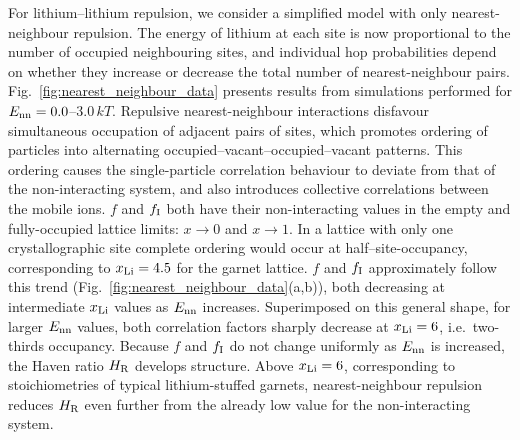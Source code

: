 \documentclass[aps,prb,twocolumn,superscriptaddress,reprint]{revtex4-1}
\newcommand{\xLi}{x_\m{Li}}
\begin{document}
For lithium--lithium repulsion, we consider a simplified model with only nearest-neighbour repulsion. 
The energy of lithium at each site is now proportional to the number of occupied neighbouring sites, and individual hop probabilities depend on whether they increase or decrease the total number of nearest-neighbour pairs. 
Fig.~\ref{fig:nearest_neighbour_data} presents results from simulations performed for $E_{\mathrm{nn}}=0.0$--$3.0\,kT$. 
Repulsive nearest-neighbour interactions disfavour simultaneous occupation of adjacent pairs of sites, which promotes ordering of particles into alternating  occupied--vacant--occupied--vacant patterns.
This ordering causes the single-particle correlation behaviour to deviate from that of the non-interacting system, and also introduces collective correlations between the mobile ions.\cite{Murch_SolStatIonics1982} $f$ and $f_{\mathrm{I}}$ both have their non-interacting values in the empty and fully-occupied lattice limits: $x\to0$ and $x\to1$. In a lattice with only one crystallographic site complete ordering would occur at half--site-occupancy, corresponding to $\xLi=4.5$ for the garnet lattice. $f$ and $f_{\mathrm{I}}$ approximately follow this trend (Fig.~\ref{fig:nearest_neighbour_data}(a,b)), both decreasing at intermediate $\xLi$ values as $E_{\mathrm{nn}}$ increases. Superimposed on this general shape, for larger $E_{\mathrm{nn}}$ values, both correlation factors sharply decrease at $\xLi=6$, i.e.\ two-thirds occupancy. Because $f$ and $f_{\mathrm{I}}$ do not change uniformly as $E_{\mathrm{nn}}$ is increased, the Haven ratio $H_{\mathrm{R}}$ develops structure. Above $\xLi=6$, corresponding to stoichiometries of typical lithium-stuffed garnets, nearest-neighbour repulsion reduces $H_{\mathrm{R}}$ even further from the already low value for the non-interacting system.
\end{document}
